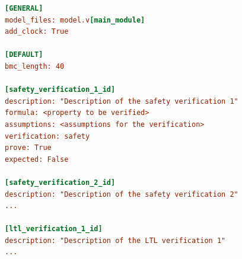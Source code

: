 \documentclass{article}
\theoremstyle{definition}
\begin{document}
\begin{lstlisting}[frame=single,language=Ini,caption=Problem file example,label=problem_file]
[GENERAL]
model_files: model.v[main_module]
add_clock: True

[DEFAULT]
bmc_length: 40

[safety_verification_1_id]
description: "Description of the safety verification 1"
formula: <property to be verified>
assumptions: <assumptions for the verification>
verification: safety
prove: True
expected: False

[safety_verification_2_id]
description: "Description of the safety verification 2"
...

[ltl_verification_1_id]
description: "Description of the LTL verification 1"
...

\end{lstlisting}
\end{document}
